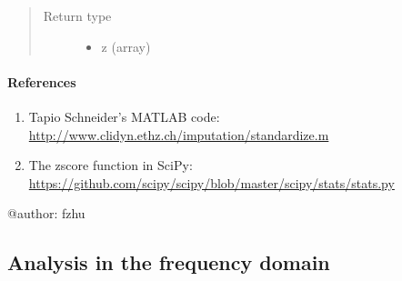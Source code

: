 \documentclass[letterpaper,10pt,english]{sphinxmanual}
\begin{document}
\begin{fulllineitems}
\begin{quote}
\begin{description}
\begin{itemize}
\end{itemize}


\item[{Return type}] \leavevmode
\begin{itemize}
\item {} 
z (array)

\end{itemize}


\end{description}\end{quote}
\paragraph{References}
\begin{enumerate}
\item {} 
Tapio Schneider's MATLAB code: \url{http://www.clidyn.ethz.ch/imputation/standardize.m}

\item {} 
The zscore function in SciPy: \url{https://github.com/scipy/scipy/blob/master/scipy/stats/stats.py}

\end{enumerate}

@author: fzhu

\end{fulllineitems}



\subsection{Analysis in the frequency domain}
\label{\detokenize{Main:analysis-in-the-frequency-domain}}
\end{document}
